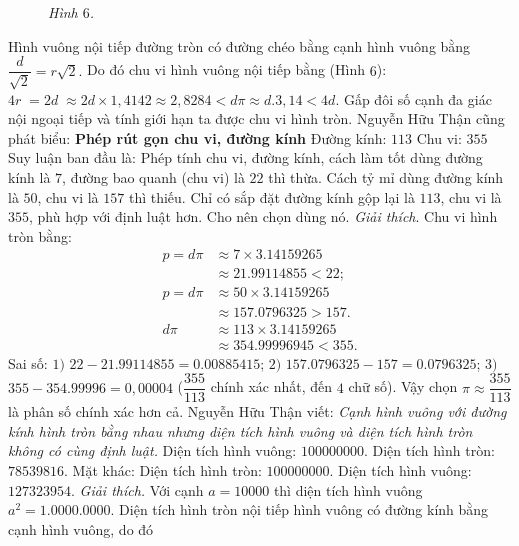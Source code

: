 \begin{multicols}{2}
\begin{figure}[H]
		\caption{\small\textit{\color{lichsutoanhoc}Hình $6$.}}
		\vspace*{-10pt}
	\end{figure}
	Hình vuông nội tiếp đường tròn có đường chéo bằng cạnh hình vuông bằng $\dfrac{d}{{\sqrt 2 }} = r\sqrt 2 .$ Do đó  chu vi hình vuông nội tiếp bằng (Hình $6$): $4r\; = 2d\; \approx 2d \times 1,4142 \approx 2,8284 < d\pi  \approx d.3,14 < 4d$.
	Gấp đôi số cạnh đa giác nội ngoại tiếp và tính giới hạn ta được chu vi hình tròn.
	Nguyễn Hữu Thận cũng phát biểu:
	\vskip 0.1cm
	\textbf{\color{lichsutoanhoc}Phép rút gọn chu vi, đường kính}
	\vskip 0.1cm 
	Đường kính: $113$	Chu vi: $355$
	\vskip 0.1cm
	Suy luận ban đầu là: Phép tính chu vi, đường kính, cách làm tốt dùng đường kính là $7$, đường bao quanh (chu vi) là $22$ thì thừa. Cách tỷ mỉ dùng đường kính là $50$, chu vi là $157$ thì thiếu. Chỉ có sắp đặt đường kính gộp lại là $113$, chu vi là $355$, phù hợp với định luật hơn. Cho nên chọn dùng nó.
	\vskip 0.1cm 
	\textit{Giải thích}. Chu vi hình tròn bằng:
	\begin{align*}
		p = d\pi  &\approx 7 \times 3.14159265 \\
		&\approx 21.99114855 < 22;\\
		p = d\pi  &\approx 50 \times 3.14159265 \\
		&\approx 157.0796325 > 157.\\
		d\pi  &\approx 113 \times 3.14159265 \\
		&\approx 354.99996945 < 355.
	\end{align*}
	Sai số:
	\vskip 0.1cm 		
	$1)$ $22 - 21.99114855 = 0.00885415$;  
	\vskip 0.1cm
	$2)$ $157.0796325 - 157 = 0.0796325$;
	\vskip 0.1cm
	$3)$ $355 - 354.99996 = 0,00004$
	($\dfrac{{355}}{{113}}$ chính xác nhất, đến $4$ chữ số).
	\vskip 0.1cm
	Vậy chọn $\pi  \approx \dfrac{{355}}{{113}}$ là phân số chính xác hơn cả. 
	\vskip 0.1cm
	Nguyễn Hữu Thận viết: \textit{Cạnh hình vuông với đường kính hình tròn bằng nhau nhưng diện tích hình vuông và diện tích hình tròn không có cùng định luật.}
	\vskip 0.1cm
	Diện tích hình vuông: $100000000$.
	\vskip 0.1cm	
	Diện tích hình tròn: $78539816$.
	\vskip 0.1cm
	Mặt khác:
	\vskip 0.1cm
	Diện tích hình tròn: $100000000$.
	\vskip 0.1cm 	
	Diện tích hình vuông: $127323954$.
	\vskip 0.1cm
	\textit{Giải thích.} Với cạnh $a = 10000$ thì diện tích hình vuông ${a^2} = 1.0000.0000$. Diện tích hình tròn nội tiếp hình vuông có đường kính bằng cạnh hình vuông, do đó 

\end{multicols}
